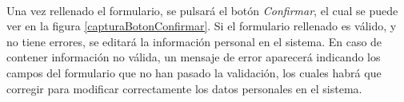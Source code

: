   \paragraph{}Una vez rellenado el formulario, se pulsará el botón
  \textit{Confirmar}, el cual se puede ver en la figura
  \ref{capturaBotonConfirmar}. Si el formulario rellenado es válido, y no tiene
  errores, se editará la información personal en el sistema. En caso de
  contener información no válida, un mensaje de error aparecerá indicando los
  campos del formulario que no han pasado la validación, los cuales habrá que
  corregir para modificar correctamente los datos personales en el sistema.
